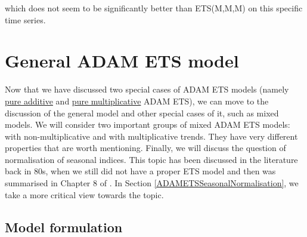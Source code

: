 \documentclass[
]{book}
\theoremstyle{definition}
\theoremstyle{definition}
\theoremstyle{definition}
\theoremstyle{definition}
\theoremstyle{remark}
\begin{document}
which does not seem to be significantly better than ETS(M,M,M) on this specific time series.

\hypertarget{ADAMETSOther}{%
\chapter{General ADAM ETS model}\label{ADAMETSOther}}

Now that we have discussed two special cases of ADAM ETS models (namely \protect\hyperlink{ADAMETSPureAdditive}{pure additive} and \protect\hyperlink{ADAMETSPureMultiplicative}{pure multiplicative} ADAM ETS), we can move to the discussion of the general model and other special cases of it, such as mixed models. We will consider two important groups of mixed ADAM ETS models: with non-multiplicative and with multiplicative trends. They have very different properties that are worth mentioning. Finally, we will discuss the question of normalisation of seasonal indices. This topic has been discussed in the literature back in 80s, when we still did not have a proper ETS model and then was summarised in Chapter 8 of \citet{Hyndman2008b}. In Section \ref{ADAMETSSeasonalNormalisation}, we take a more critical view towards the topic.

\hypertarget{ADAMETSGeneral}{%
\section{Model formulation}\label{ADAMETSGeneral}}
\end{document}
